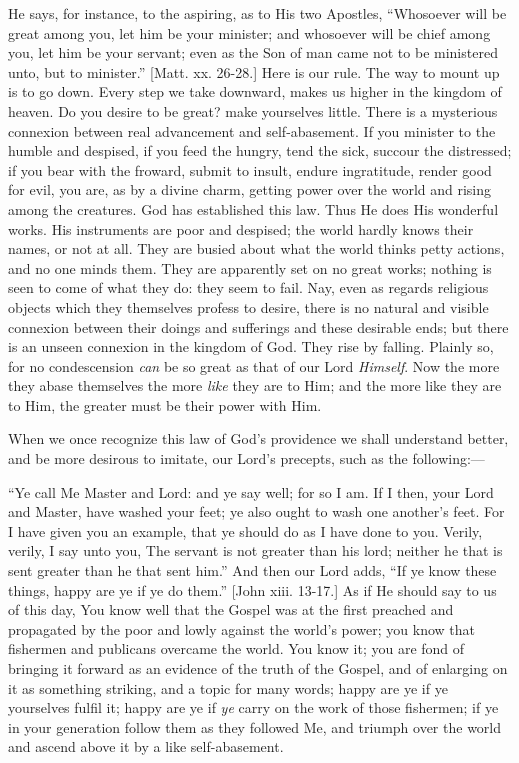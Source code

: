 He says, for instance, to the aspiring, as to His two Apostles,
``Whosoever will be great among you, let him be your minister; and
whosoever will be chief among you, let him be your servant; even as
the Son of man came not to be ministered unto, but to minister.''
[Matt. xx. 26-28.] Here is our rule. The way to mount up is to go
down. Every step we take downward, makes us higher in the kingdom of
heaven. Do you desire to be great? make yourselves little. There is a
mysterious connexion between real advancement and self-abasement. If
you minister to the humble and despised, if you feed the hungry, tend
the sick, succour the distressed; if you bear with the froward, submit
to insult, endure ingratitude, render good for evil, you are, as by a
divine charm, getting power over the world and rising among the
creatures. God has established this law. Thus He does His wonderful
works. His instruments are poor and despised; the world hardly knows
their names, or not at all. They are busied about what the world
thinks petty actions, and no one minds them. They are apparently set
on no great works; nothing is seen to come of what they do: they seem
to fail. Nay, even as regards religious objects which they themselves
profess to desire, there is no natural and visible connexion between
their doings and sufferings and these desirable ends; but there is an
unseen connexion in the kingdom of God. They rise by falling. Plainly
so, for no condescension \emph{can} be so great as that of our Lord \emph{Himself}.
Now the more they abase themselves the more \emph{like} they are to
Him; and the more like they are to Him, the greater must be their
power with Him.

When we once recognize this law of God's providence we shall
understand better, and be more desirous to imitate, our Lord's
precepts, such as the following:—

``Ye call Me Master and Lord: and ye say well; for so I am. If
I then, your Lord and Master, have washed your feet; ye also ought to
wash one another's feet. For I have given you an example, that ye
should do as I have done to you. Verily, verily, I say unto you, The
servant is not greater than his lord; neither he that is sent greater
than he that sent him.'' And then our Lord adds, ``If ye know
these things, happy are ye if ye do them.'' [John xiii. 13-17.] As
if He should say to us of this day, You know well that the Gospel was
at the first preached and propagated by the poor and lowly against the
world's power; you know that fishermen and publicans overcame the
world. You know it; you are fond of bringing it forward as an evidence
of the truth of the Gospel, and of enlarging on it as something
striking, and a topic for many words; happy are ye if ye yourselves
fulfil it; happy are ye if \emph{ye} carry on the work of those
fishermen; if ye in your generation follow them as they followed Me,
and triumph over the world and ascend above it by a like
self-abasement.

